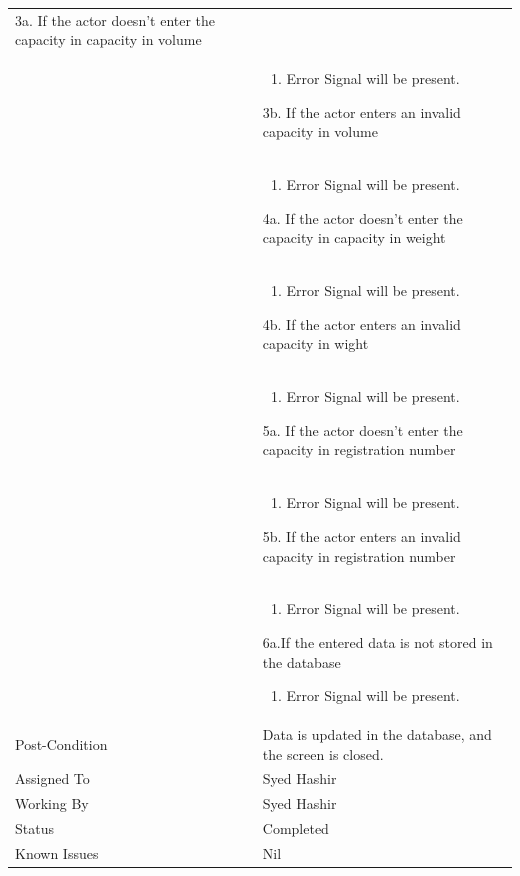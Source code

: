 \documentclass[12pt,a4paper]{article}
\begin{document}
\begin{longtable}{| p{3cm}|p{12cm}|}
3a. If the actor doesn't enter the capacity in capacity in volume\\ 	
&	\begin{enumerate}
		\item Error Signal will be present.
	\end{enumerate}
3b. If the actor enters an invalid capacity in volume \\ 	
&	\begin{enumerate}
		\item Error Signal will be present.
	\end{enumerate}
4a. If the actor doesn't enter the capacity in capacity in weight\\ 	
&	\begin{enumerate}
		\item Error Signal will be present.
	\end{enumerate}
4b. If the actor enters an invalid capacity in wight\\ 	
&	\begin{enumerate}
		\item Error Signal will be present.
	\end{enumerate}
5a. If the actor doesn't enter the capacity in registration number\\ 	
&	\begin{enumerate}
		\item Error Signal will be present.
	\end{enumerate}
5b. If the actor enters an invalid capacity in registration number\\ 	
&	\begin{enumerate}
		\item Error Signal will be present.
	\end{enumerate}
6a.If the entered data is not stored in the database  
\begin{enumerate}
		\item Error Signal will be present.
	\end{enumerate}
\\ \hline
Post-Condition &  Data is updated in the database, and the screen is closed. \\\hline
Assigned To &  Syed Hashir
\\ \hline
Working By &   Syed Hashir
\\ \hline
Status & 	Completed	
\\ \hline
Known Issues & Nil
\\\hline
\end{longtable}
\end{document}
